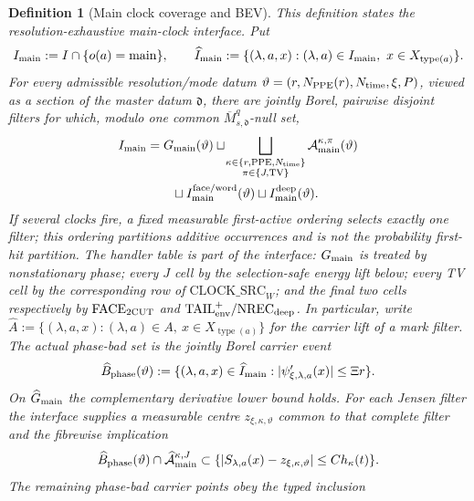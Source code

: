 \documentclass[11pt]{article}
\newtheorem{definition}[theorem]{Definition}
\begin{document}
\begin{definition}[Main clock coverage and BEV]
\label{def:main-source-BEV}
This definition states the resolution-exhaustive main-clock interface.  Put
\[
 I_{\rm main}:=I\cap\{o(a)={\rm main}\},
 \qquad
 \widehat I_{\rm main}:=
 \{(\lambda,a,x):(\lambda,a)\in I_{\rm main},\
                    x\in X_{\operatorname{type}(a)}\}.
\]
For every admissible resolution/mode datum
$\vartheta=(r,N_{\rm PPE}(r),N_{\rm time},\xi,P)$, viewed as a section of
the master datum $\mathfrak d$, there are jointly Borel,
pairwise disjoint filters for which, modulo one common
$\overline M_{s,\mathfrak d}^{q}$-null set,
\begin{equation}
\label{eq:main-clock-coverage}
\begin{aligned}
 I_{\rm main}
 &=G_{\rm main}(\vartheta)
 \sqcup\!\bigsqcup_{\substack{
      \kappa\in\{r,{\rm PPE},N_{\rm time}\}\\
      \pi\in\{J,{\rm TV}\}}}
      \mathcal A_{\rm main}^{\kappa,\pi}(\vartheta)\\
 &\qquad\sqcup I_{\rm main}^{\rm face/word}(\vartheta)
 \sqcup I_{\rm main}^{\rm deep}(\vartheta).
\end{aligned}
\end{equation}
If several clocks fire, a fixed measurable first-active ordering selects
exactly one filter; this ordering partitions additive occurrences and is not
the probability first-hit partition.  The handler table is part of the
interface: $G_{\rm main}$ is treated by nonstationary phase; every $J$ cell
by the selection-safe energy lift below; every TV cell by the corresponding
row of $\mathrm{CLOCK\_SRC}_{W}$; and the final two cells respectively by
$\mathrm{FACE}_{\rm 2CUT}$ and
$\mathrm{TAIL}_{\rm env}^{+}/\mathrm{NREC}_{\rm deep}$.  In particular,
write $\widehat A:=\{(\lambda,a,x):(\lambda,a)\in A,\
x\in X_{\operatorname{type}(a)}\}$ for the carrier lift of a mark filter.
The actual phase-bad set is the jointly Borel carrier event
\[
 \widehat B_{\rm phase}(\vartheta):=
 \{(\lambda,a,x)\in\widehat I_{\rm main}:
   |\psi'_{\xi,\lambda,a}(x)|\le \Xi r\}.
\]
On $\widehat G_{\rm main}$ the complementary derivative lower bound holds.
For each Jensen filter the interface supplies a measurable centre
$z_{\xi,\kappa,\vartheta}$ common to that complete filter and the fibrewise
implication
\[
 \widehat B_{\rm phase}(\vartheta)\cap
 \widehat{\mathcal A}_{\rm main}^{\kappa,J}
 \subset
 \{|S_{\lambda,a}(x)-z_{\xi,\kappa,\vartheta}|
          \le C h_\kappa(t)\}.
\]
The remaining phase-bad carrier points obey the typed inclusion

\end{definition}
\end{document}
